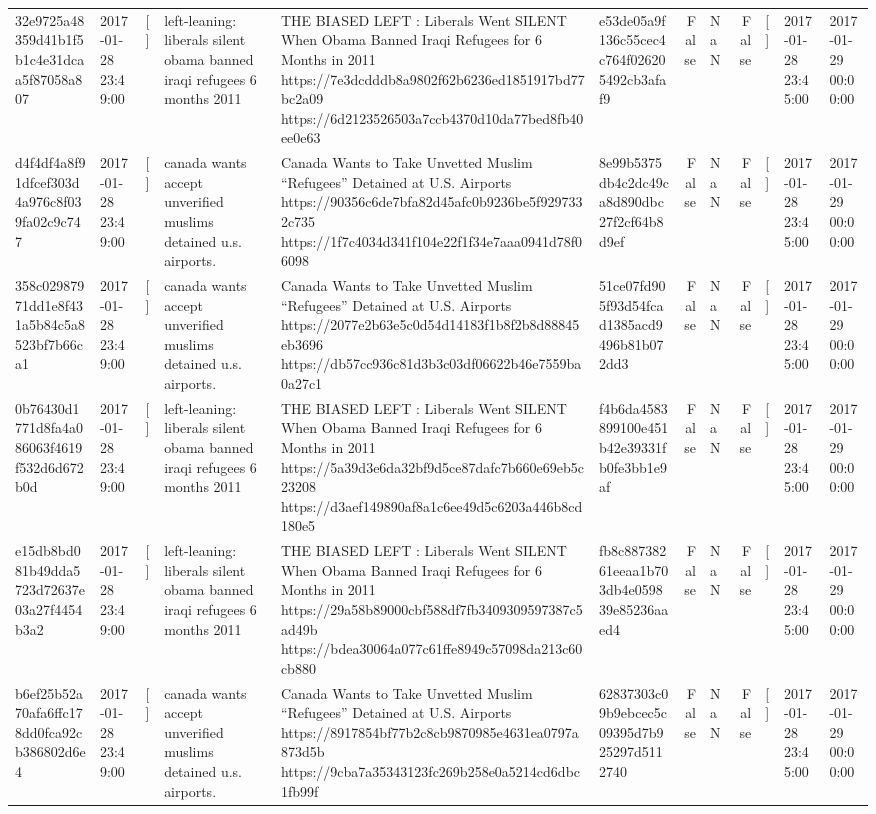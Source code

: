 \begin{tabular}{llllllrlrlll}
32e9725a48359d41b1f5b1c4e31dcaa5f87058a807 & 2017-01-28 23:49:00 & [] & left-leaning: liberals silent obama banned iraqi refugees 6 months 2011 & THE BIASED LEFT : Liberals Went SILENT When Obama Banned Iraqi Refugees for 6 Months in 2011 https://7e3dcdddb8a9802f62b6236ed1851917bd77bc2a09 https://6d2123526503a7ccb4370d10da77bed8fb40ee0e63 & e53de05a9f136c55cec4c764f026205492cb3afaf9 & False & NaN & False & [] & 2017-01-28 23:45:00 & 2017-01-29 00:00:00 \\
d4f4df4a8f91dfcef303d4a976c8f039fa02c9c747 & 2017-01-28 23:49:00 & [] & canada wants accept unverified muslims detained u.s. airports. & Canada Wants to Take Unvetted Muslim “Refugees” Detained at U.S. Airports https://90356c6de7bfa82d45afc0b9236be5f9297332c735 https://1f7c4034d341f104e22f1f34e7aaa0941d78f06098 & 8e99b5375db4c2dc49ca8d890dbc27f2cf64b8d9ef & False & NaN & False & [] & 2017-01-28 23:45:00 & 2017-01-29 00:00:00 \\
358c02987971dd1e8f431a5b84c5a8523bf7b66ca1 & 2017-01-28 23:49:00 & [] & canada wants accept unverified muslims detained u.s. airports. & Canada Wants to Take Unvetted Muslim “Refugees” Detained at U.S. Airports https://2077e2b63e5c0d54d14183f1b8f2b8d88845eb3696 https://db57cc936c81d3b3c03df06622b46e7559ba0a27c1 & 51ce07fd905f93d54fcad1385acd9496b81b072dd3 & False & NaN & False & [] & 2017-01-28 23:45:00 & 2017-01-29 00:00:00 \\
0b76430d1771d8fa4a086063f4619f532d6d672b0d & 2017-01-28 23:49:00 & [] & left-leaning: liberals silent obama banned iraqi refugees 6 months 2011 & THE BIASED LEFT : Liberals Went SILENT When Obama Banned Iraqi Refugees for 6 Months in 2011 https://5a39d3e6da32bf9d5ce87dafc7b660e69eb5c23208 https://d3aef149890af8a1c6ee49d5c6203a446b8cd180e5 & f4b6da4583899100e451b42e39331fb0fe3bb1e9af & False & NaN & False & [] & 2017-01-28 23:45:00 & 2017-01-29 00:00:00 \\
e15db8bd081b49dda5723d72637e03a27f4454b3a2 & 2017-01-28 23:49:00 & [] & left-leaning: liberals silent obama banned iraqi refugees 6 months 2011 & THE BIASED LEFT : Liberals Went SILENT When Obama Banned Iraqi Refugees for 6 Months in 2011 https://29a58b89000cbf588df7fb3409309597387c5ad49b https://bdea30064a077c61ffe8949c57098da213c60cb880 & fb8c88738261eeaa1b703db4e059839e85236aaed4 & False & NaN & False & [] & 2017-01-28 23:45:00 & 2017-01-29 00:00:00 \\
b6ef25b52a70afa6ffc178dd0fca92cb386802d6e4 & 2017-01-28 23:49:00 & [] & canada wants accept unverified muslims detained u.s. airports. & Canada Wants to Take Unvetted Muslim “Refugees” Detained at U.S. Airports https://8917854bf77b2c8cb9870985e4631ea0797a873d5b https://9cba7a35343123fc269b258e0a5214cd6dbc1fb99f & 62837303c09b9ebcec5c09395d7b925297d5112740 & False & NaN & False & [] & 2017-01-28 23:45:00 & 2017-01-29 00:00:00 \\

\end{tabular}
